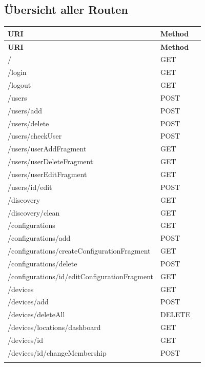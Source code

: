 \subsection{Übersicht aller Routen}
\begin{longtable}{ p{11cm} p{4cm} l}
\hline 
\multicolumn{1}{p{11cm}}{\textbf{URI}} & 
\multicolumn{1}{p{4cm}}{\textbf{Method}} &  \\ \hline 
\endfirsthead

\hline 
\multicolumn{1}{p{11cm}}{\textbf{URI}} & 
\multicolumn{1}{p{4cm}}{\textbf{Method}} &  \\ \hline 
\endhead

/	&	GET	 \\ \addlinespace
/login	&	GET	 \\ \addlinespace
/logout	&	GET	 \\ \addlinespace
/users	&	POST	 \\ \addlinespace
/users/add	&	POST	 \\ \addlinespace
/users/delete	&	POST	 \\ \addlinespace
/users/checkUser	&	POST	 \\ \addlinespace
/users/userAddFragment	&	GET	 \\ \addlinespace
/users/userDeleteFragment	&	GET	 \\ \addlinespace
/users/userEditFragment	&	GET	 \\ \addlinespace
/users/{id}/edit	&	POST	 \\ \addlinespace
/discovery	&	GET	 \\ \addlinespace
/discovery/clean	&	GET	 \\ \addlinespace
/configurations	&	GET	 \\ \addlinespace
/configurations/add	&	POST	 \\ \addlinespace
/configurations/createConfigurationFragment	&	GET	 \\ \addlinespace
/configurations/delete	&	POST	 \\ \addlinespace
/configurations/{id}/editConfigurationFragment	&	GET	 \\ \addlinespace
/devices	&	GET	 \\ \addlinespace
/devices/add	&	POST	 \\ \addlinespace
/devices/deleteAll	&	DELETE	 \\ \addlinespace
/devices/locations/dashboard	&	GET	 \\ \addlinespace
/devices/{id}	&	GET	 \\ \addlinespace
/devices/{id}/changeMembership	&	POST	 \\ \addlinespace

\end{longtable}
